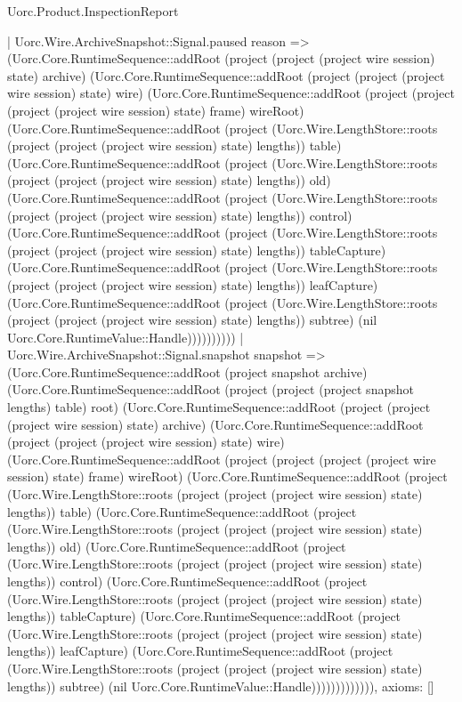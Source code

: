 \begin{lexlean}{Uorc.Product.InspectionReport}
\begin{semanticmodule}
{    | Uorc.Wire.ArchiveSnapshot::Signal.paused reason => (Uorc.Core.RuntimeSequence::addRoot (project (project (project wire session) state) archive) (Uorc.Core.RuntimeSequence::addRoot (project (project (project wire session) state) wire) (Uorc.Core.RuntimeSequence::addRoot (project (project (project (project wire session) state) frame) wireRoot) (Uorc.Core.RuntimeSequence::addRoot (project (Uorc.Wire.LengthStore::roots (project (project (project wire session) state) lengths)) table) (Uorc.Core.RuntimeSequence::addRoot (project (Uorc.Wire.LengthStore::roots (project (project (project wire session) state) lengths)) old) (Uorc.Core.RuntimeSequence::addRoot (project (Uorc.Wire.LengthStore::roots (project (project (project wire session) state) lengths)) control) (Uorc.Core.RuntimeSequence::addRoot (project (Uorc.Wire.LengthStore::roots (project (project (project wire session) state) lengths)) tableCapture) (Uorc.Core.RuntimeSequence::addRoot (project (Uorc.Wire.LengthStore::roots (project (project (project wire session) state) lengths)) leafCapture) (Uorc.Core.RuntimeSequence::addRoot (project (Uorc.Wire.LengthStore::roots (project (project (project wire session) state) lengths)) subtree) (nil Uorc.Core.RuntimeValue::Handle))))))))))
    | Uorc.Wire.ArchiveSnapshot::Signal.snapshot snapshot => (Uorc.Core.RuntimeSequence::addRoot (project snapshot archive) (Uorc.Core.RuntimeSequence::addRoot (project (project (project snapshot lengths) table) root) (Uorc.Core.RuntimeSequence::addRoot (project (project (project wire session) state) archive) (Uorc.Core.RuntimeSequence::addRoot (project (project (project wire session) state) wire) (Uorc.Core.RuntimeSequence::addRoot (project (project (project (project wire session) state) frame) wireRoot) (Uorc.Core.RuntimeSequence::addRoot (project (Uorc.Wire.LengthStore::roots (project (project (project wire session) state) lengths)) table) (Uorc.Core.RuntimeSequence::addRoot (project (Uorc.Wire.LengthStore::roots (project (project (project wire session) state) lengths)) old) (Uorc.Core.RuntimeSequence::addRoot (project (Uorc.Wire.LengthStore::roots (project (project (project wire session) state) lengths)) control) (Uorc.Core.RuntimeSequence::addRoot (project (Uorc.Wire.LengthStore::roots (project (project (project wire session) state) lengths)) tableCapture) (Uorc.Core.RuntimeSequence::addRoot (project (Uorc.Wire.LengthStore::roots (project (project (project wire session) state) lengths)) leafCapture) (Uorc.Core.RuntimeSequence::addRoot (project (Uorc.Wire.LengthStore::roots (project (project (project wire session) state) lengths)) subtree) (nil Uorc.Core.RuntimeValue::Handle))))))))))))),
  axioms: []
}


\end{semanticmodule}
\end{lexlean}
